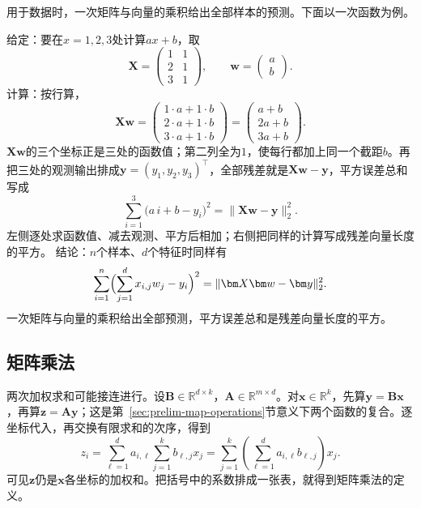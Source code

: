 用于数据时，一次矩阵与向量的乘积给出全部样本的预测。下面以一次函数为例。
\begin{example}[用矩阵与向量的乘积计算一次函数的取值与残差]
\label{ex:ls-affine-predictions}
给定：要在$x=1,2,3$处计算$ax+b$，取
\[
\bm X=\begin{pmatrix}1&1\\2&1\\3&1\end{pmatrix},\qquad
\bm w=\begin{pmatrix}a\\b\end{pmatrix}.
\]
计算：按行算，
\[
 \bm X\bm w=\begin{pmatrix}1\cdot a+1\cdot b\\2\cdot a+1\cdot b\\3\cdot a+1\cdot b\end{pmatrix}=\begin{pmatrix}a+b\\2a+b\\3a+b\end{pmatrix}.
\]
$\bm X\bm w$的三个坐标正是三处的函数值；第二列全为$1$，使每行都加上同一个截距$b$。再把三处的观测输出排成$\bm y=(y_1,y_2,y_3)^\top$，全部残差就是$\bm X\bm w-\bm y$，平方误差总和写成
\[
 \sum_{i=1}^3\bigl(a\,i+b-y_i\bigr)^2
 =\lVert\bm X\bm w-\bm y\rVert_2^2.
\]
左侧逐处求函数值、减去观测、平方后相加；右侧把同样的计算写成残差向量长度的平方。
结论：$n$个样本、$d$个特征时同样有
\[
 \sum_{i=1}^n\Bigl(\sum_{j=1}^d x_{i,j}w_j-y_i\Bigr)^2=\lVert\bm X\bm w-\bm y\rVert_2^2.
\]
一次矩阵与向量的乘积给出全部预测，平方误差总和是残差向量长度的平方。
\end{example}

\subsection{矩阵乘法}
\label{sec:ls-matrix-operations}
\label{sec:ls-multiplication}
\label{sec:prelim-linear-actions-composition}

两次加权求和可能接连进行。设$\bm B\in\mathbb R^{d\times k}$，$\bm A\in\mathbb R^{m\times d}$。对$\bm x\in\mathbb R^k$，先算$\bm y=\bm B\bm x$，再算$\bm z=\bm A\bm y$；这是第~\ref{sec:prelim-map-operations}节意义下两个函数的复合。逐坐标代入，再交换有限求和的次序，得到
\begin{equation}
 z_i=\sum_{\ell=1}^d a_{i,\ell}\sum_{j=1}^k b_{\ell,j}x_j
 =\sum_{j=1}^k\left(\sum_{\ell=1}^d a_{i,\ell}b_{\ell,j}\right)x_j.
 \label{eq:linear-algebra-matrix-product}
\end{equation}
可见$\bm z$仍是$\bm x$各坐标的加权和。把括号中的系数排成一张表，就得到矩阵乘法的定义。

